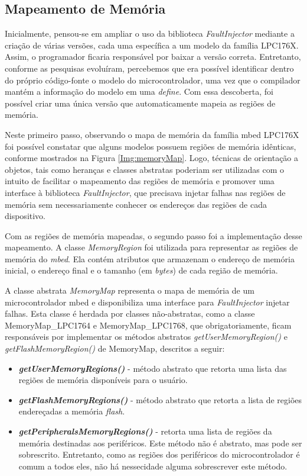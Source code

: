 \subsection{Mapeamento de Memória} \label{subsec:MapDeMemoria}

Inicialmente, pensou-se em ampliar o uso da biblioteca \textit{FaultInjector} mediante a criação de várias versões, cada uma específica a um modelo da família LPC176X. Assim, o programador ficaria responsável por baixar a versão correta. Entretanto, conforme as pesquisas evoluíram, percebemos que era possível identificar dentro do próprio código-fonte o modelo do microcontrolador, uma vez que o compilador mantém a informação do modelo em uma \textit{define}. Com essa descoberta, foi possível criar uma única versão que automaticamente mapeia as regiões de memória.

Neste primeiro passo, observando o mapa de memória da família mbed LPC176X \cite{manualLpc176x:2016} foi possível constatar que alguns modelos possuem regiões de memória idênticas, conforme mostrados na Figura \ref{Img:memoryMap}. Logo, técnicas de orientação a objetos, tais como heranças e classes abstratas poderiam ser utilizadas com o intuito de facilitar o mapeamento das regiões de memória e promover uma interface à biblioteca \textit{FaultInjector}, que precisava injetar falhas nas regiões de memória sem necessariamente conhecer os endereços das regiões de cada dispositivo.

Com as regiões de memória mapeadas, o segundo passo foi a implementação desse mapeamento. A classe \textit{MemoryRegion}\cite{Kruger:2014} foi utilizada para representar as regiões de memória do \textit{mbed}. Ela contém atributos que armazenam o endereço de memória inicial, o endereço final e o tamanho (em \textit{bytes}) de cada região de memória. 

A classe abstrata \textit{MemoryMap} representa o mapa de memória de um microcontrolador mbed e disponibiliza uma interface para \textit{FaultInjector} injetar falhas. Esta classe é herdada por classes não-abstratas, como a classe MemoryMap\_LPC1764 e MemoryMap\_LPC1768, que obrigatoriamente, ficam responsáveis por implementar os métodos abstratos \textit{getUserMemoryRegion()} e \textit{getFlashMemoryRegion()} de MemoryMap, descritos a seguir:

\begin{itemize}
	\item \textbf{\textit{getUserMemoryRegions()}} - método abstrato que retorta uma lista das regiões de memória disponíveis para o usuário.				
	
	\item \textbf{\textit{getFlashMemoryRegions()}} - método abstrato que retorta a lista de regiões endereçadas a memória \textit{flash}.
	
	\item \textbf{\textit{getPeripheralsMemoryRegions()}} - retorta uma lista de regiões da memória destinadas aos periféricos. Este método não é abstrato, mas pode ser sobrescrito. Entretanto, como as regiões dos periféricos do microcontrolador é comum a todos eles, não há nessecidade alguma sobrescrever este método.
\end{itemize}

